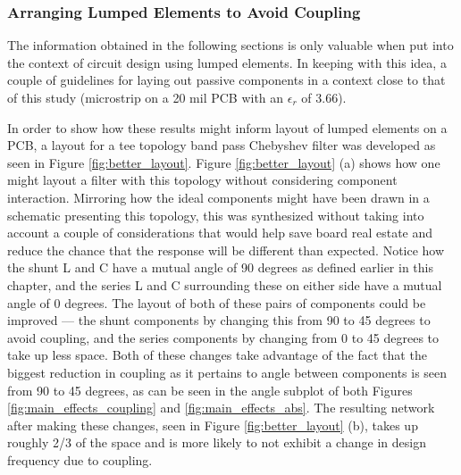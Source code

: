 \documentclass[12pt]{usfcoe}
\begin{document}
    \subsubsection{Arranging Lumped Elements to Avoid Coupling}
    The information obtained in the following sections is only valuable when put into the context of circuit design using lumped elements.
    In keeping with this idea, a couple of guidelines for laying out passive components in a context close to that of this study (microstrip on a 20 mil PCB with an $\epsilon_r$ of 3.66).
    
    In order to show how these results might inform layout of lumped elements on a PCB, a layout for a tee topology band pass Chebyshev filter was developed as seen in Figure \ref{fig:better_layout}. 
    Figure \ref{fig:better_layout} (a) shows how one might layout a filter with this topology without considering component interaction.
    Mirroring how the ideal components might have been drawn in a schematic presenting this topology, this was synthesized without taking into account a couple of considerations that would help save board real estate and reduce the chance that the response will be different than expected.
    Notice how the shunt L and C have a mutual angle of 90 degrees as defined earlier in this chapter, and the series L and C surrounding these on either side have a mutual angle of 0 degrees. 
    The layout of both of these pairs of components could be improved --- the shunt components by changing this from 90 to 45 degrees to avoid coupling, and the series components by changing from 0 to 45 degrees to take up less space.
    Both of these changes take advantage of the fact that the biggest reduction in coupling as it pertains to angle between components is seen from 90 to 45 degrees, as can be seen in the angle subplot of both Figures \ref{fig:main_effects_coupling} and \ref{fig:main_effects_abs}. 
    The resulting network after making these changes, seen in Figure \ref{fig:better_layout} (b), takes up roughly 2/3 of the space and is more likely to not exhibit a change in design frequency due to coupling. 
	
\end{document}
